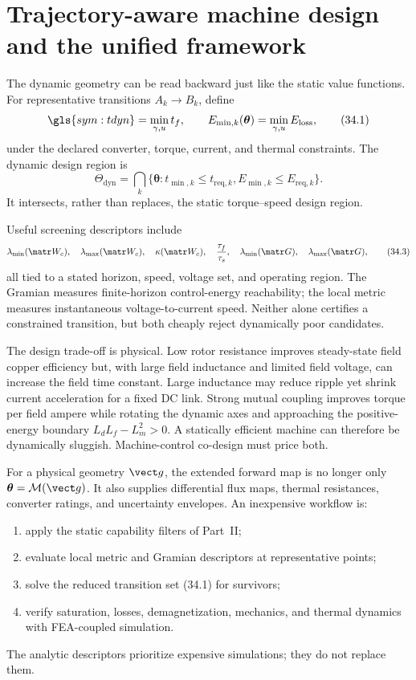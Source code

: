 \section{Trajectory-aware machine design and the unified framework}
\label{sec:dynamic-design}

The dynamic geometry can be read backward just like the static value
functions.  For representative transitions \(A_k\rightarrow B_k\), define
\[
 \gls{sym:tdyn}=\min_{\gamma,u}t_f,
 \qquad
 E_{\min,k}(\boldsymbol\theta)=\min_{\gamma,u}E_{\mathrm{loss}},
 \tag{34.1}
\]
under the declared converter, torque, current, and thermal constraints.  The
dynamic design region is
\[
 \Theta_{\mathrm{dyn}}=\bigcap_k
 \{\boldsymbol\theta:t_{\min,k}\leq t_{\mathrm{req},k},
 E_{\min,k}\leq E_{\mathrm{req},k}\}.
 \tag{34.2}
\]
It intersects, rather than replaces, the static torque--speed design region.

Useful screening descriptors include
\[
 \lambda_{\min}(\matr W_c),\quad
 \lambda_{\max}(\matr W_c),\quad
 \kappa(\matr W_c),\quad
 \frac{\tau_f}{\tau_s},\quad
 \lambda_{\min}(\matr G),\quad
 \lambda_{\max}(\matr G),
 \tag{34.3}
\]
all tied to a stated horizon, speed, voltage set, and operating region.  The
Gramian measures finite-horizon control-energy reachability; the local metric
measures instantaneous voltage-to-current speed.  Neither alone certifies a
constrained transition, but both cheaply reject dynamically poor candidates.



The design trade-off is physical.  Low rotor resistance improves steady-state
field copper efficiency but, with large field inductance and limited field
voltage, can increase the field time constant.  Large inductance may reduce
ripple yet shrink current acceleration for a fixed DC link.  Strong mutual
coupling improves torque per field ampere while rotating the dynamic axes and
approaching the positive-energy boundary
\(L_dL_f-L_m^2>0\).  A statically efficient machine can therefore be
dynamically sluggish.  Machine-control co-design must price both.

For a physical geometry \(\vect g\), the extended forward map is no longer
only \(\boldsymbol\theta=\mathcal M(\vect g)\).  It also supplies differential
flux maps, thermal resistances, converter ratings, and uncertainty envelopes.
An inexpensive workflow is:
\begin{enumerate}
 \item apply the static capability filters of Part~II;
 \item evaluate local metric and Gramian descriptors at representative points;
 \item solve the reduced transition set (34.1) for survivors;
 \item verify saturation, losses, demagnetization, mechanics, and thermal
 dynamics with FEA-coupled simulation.
\end{enumerate}
The analytic descriptors prioritize expensive simulations; they do not
replace them.


